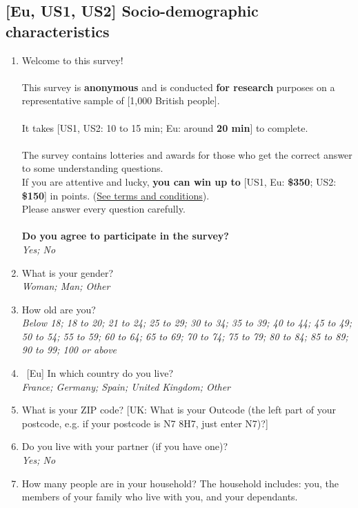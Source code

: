 \subsection*{[Eu, US1, US2] Socio-demographic characteristics}
\begin{enumerate}
\item Welcome to this survey!\\
\\
This survey is \textbf{anonymous} and is conducted \textbf{for research} purposes on a representative sample of [1,000 British people].\\
 \\
It takes [US1, US2: 10 to 15 min; Eu: around \textbf{20 min}] to complete.  \\
 \\
The survey contains lotteries and awards for those who get the correct answer to some understanding questions.\\
If you are attentive and lucky, \textbf{you can win up to }[US1, Eu: \textbf{\$350}; US2: \textbf{\$150}] in points. (\href{https://uvafeb.eu.qualtrics.com/WRQualtricsControlPanel/File.php?F=F_cBZAXTgNktGZbee&download=1}{See terms and conditions}).    \\
Please answer every question carefully.  \\
 \\
\textbf{Do you agree to participate in the survey?}
\\ \textit{Yes; No}
\item What is your gender?
\\ \textit{Woman; Man; Other}
\item How old are you?
\\ \textit{Below 18; 18 to 20; 21 to 24; 25 to 29; 30 to 34; 35 to 39; 40 to 44; 45 to 49; 50 to 54; 55 to 59; 60 to 64; 65 to 69; 70 to 74; 75 to 79; 80 to 84; 85 to 89; 90 to 99; 100 or above}
\item ~[Eu] In which country do you live?
\\ \textit{France; Germany; Spain; United Kingdom; Other}
\item What is your ZIP code? [UK: What is your Outcode (the left part of your postcode, e.g. if your postcode is N7 8H7, just enter N7)?]
\item \label{q:partner} Do you live with your partner (if you have one)?
\\ \textit{Yes; No}
\item How many people are in your household? The household includes: you, the members of your family who live with you, and your dependants. %

\end{enumerate}
